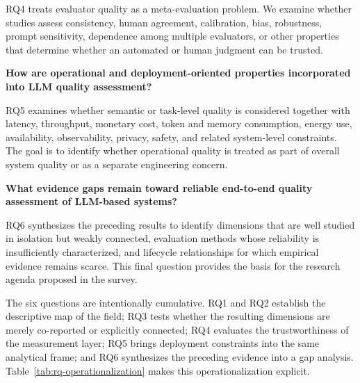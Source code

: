\begin{description}
RQ4 treats evaluator quality as a meta-evaluation problem. We examine whether studies assess consistency, human agreement, calibration, bias, robustness, prompt sensitivity, dependence among multiple evaluators, or other properties that determine whether an automated or human judgment can be trusted.

\item[RQ5:] \textbf{How are operational and deployment-oriented properties incorporated into LLM quality assessment?}

RQ5 examines whether semantic or task-level quality is considered together with latency, throughput, monetary cost, token and memory consumption, energy use, availability, observability, privacy, safety, and related system-level constraints. The goal is to identify whether operational quality is treated as part of overall system quality or as a separate engineering concern.

\item[RQ6:] \textbf{What evidence gaps remain toward reliable end-to-end quality assessment of LLM-based systems?}

RQ6 synthesizes the preceding results to identify dimensions that are well studied in isolation but weakly connected, evaluation methods whose reliability is insufficiently characterized, and lifecycle relationships for which empirical evidence remains scarce. This final question provides the basis for the research agenda proposed in the survey.

\end{description}


The six questions are intentionally cumulative. RQ1 and RQ2 establish the descriptive map of the field; RQ3 tests whether the resulting dimensions are merely co-reported or explicitly connected; RQ4 evaluates the trustworthiness of the measurement layer; RQ5 brings deployment constraints into the same analytical frame; and RQ6 synthesizes the preceding evidence into a gap analysis. Table~\ref{tab:rq-operationalization} makes this operationalization explicit.

